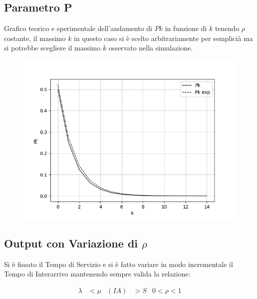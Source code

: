 \documentclass[12pt,a4paper]{article}
\begin{document}
\subsection{Parametro P}
Grafico teorico e sperimentale dell'andamento di $Pk$ in funzione di $k$ tenendo $\rho$ costante, il massimo $k$ in questo caso si è scelto arbitrariamente per semplicià ma si potrebbe scegliere il massimo $k$ osservato nella simulazione.
\begin{figure}[h]
\centering
\includegraphics[scale=0.6]{Pk}
\end{figure}

\newpage
\subsection{Output con Variazione di $\rho$}
Si è fissato il Tempo di Servizio e si è fatto variare in modo incrementale il Tempo di Interarrivo mantenendo sempre valida la relazione:


\begin{align*}
\lambda &< \mu & (IA) &> S & 0 < \rho < 1
\end{align*}
\end{document}
